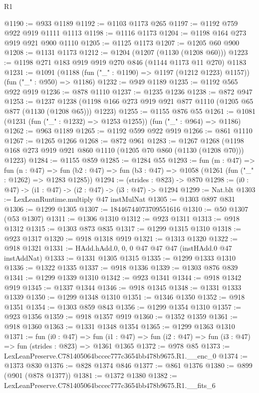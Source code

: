 \begin{lexlean}{R1}
\begin{coremodule}
@1190 := @933 @1189
@1192 := @1103 @1173 @265
@1197 := @1192 @759 @922 @919 @1111 @1113
@1198 := @1116 @1173
@1204 := @1198 @164 @273 @919 @921 @900 @1110
@1205 := @1125 @1173
@1207 := @1205 @60 @900
@1208 := @1131 @1173
@1212 := @1204 (@1207 (@1130 (@1208 @60)))
@1223 := @1198 @271 @183 @919 @919 @270 @846 (@1144 @1173 @11 @270) @1183
@1231 := @1091 (@1188 (fun ("_" : @1190) => @1197 (@1212 @1223) @1157)) (fun ("_" : @950) => @1186)
@1232 := @949 @1189
@1235 := @1192 @565 @922 @919
@1236 := @878 @1110
@1237 := @1235 @1236
@1238 := @872 @947
@1253 := @1237
    @1238
    (@1198 @166 @273 @919 @921 @877 @1110 (@1205 @65 @877 (@1130 (@1208 @65))) @1223)
@1255 := @1155 @876 @55
@1261 := @1081 (@1231 (fun ("_" : @1232) => @1253 @1255)) (fun ("_" : @964) => @1186)
@1262 := @963 @1189
@1265 := @1192 @599 @922 @919
@1266 := @861 @1110
@1267 := @1265 @1266
@1268 := @872 @961
@1283 := @1267
    @1268
    (@1198 @168 @273 @919 @921 @860 @1110 (@1205 @70 @860 (@1130 (@1208 @70))) @1223)
@1284 := @1155 @859
@1285 := @1284 @55
@1293 := fun (m : @47) =>
  fun (n : @47) =>
  fun (b2 : @47) => fun (b3 : @47) => @1058 (@1261 (fun ("_" : @1262) => @1283 @1285))
@1294 := (strides : @823) -> @870
@1298 := (i0 : @47) -> (i1 : @47) -> (i2 : @47) -> (i3 : @47) -> @1294
@1299 := Nat.blt
@1303 := LexLeanRuntime.multiply @47 instMulNat
@1305 := @1303 @897 @831
@1306 := @1299 @1305
@1307 := 18446744073709551616
@1310 := @50 @1307 (@53 @1307)
@1311 := @1306 @1310
@1312 := @923 @1311
@1313 := @918 @1312
@1315 := @1303 @873 @835
@1317 := @1299 @1315 @1310
@1318 := @923 @1317
@1320 := @918 @1318 @919
@1321 := @1313 @1320
@1322 := @918 @1321
@1331 := HAdd.hAdd.{0, 0, 0} @47 @47 @47 (instHAdd.{0} @47 instAddNat)
@1333 := @1331 @1305 @1315
@1335 := @1299 @1333 @1310
@1336 := @1322 @1335
@1337 := @918 @1336
@1339 := @1303 @876 @839
@1341 := @1299 @1339 @1310
@1342 := @923 @1341
@1344 := @918 @1342 @919
@1345 := @1337 @1344
@1346 := @918 @1345
@1348 := @1331 @1333 @1339
@1350 := @1299 @1348 @1310
@1351 := @1346 @1350
@1352 := @918 @1351
@1354 := @1303 @859 @843
@1356 := @1299 @1354 @1310
@1357 := @923 @1356
@1359 := @918 @1357 @919
@1360 := @1352 @1359
@1361 := @918 @1360
@1363 := @1331 @1348 @1354
@1365 := @1299 @1363 @1310
@1371 := fun (i0 : @47) =>
  fun (i1 : @47) => fun (i2 : @47) => fun (i3 : @47) => fun (strides : @823) => @1361 @1365
@1372 := @978 @85
@1373 := LexLeanPreserve.C781405064bccec777c3654bb478b9675.R1.__enc_0
@1374 := @1373 @830
@1376 := @828 @1374 @846
@1377 := @861 @1376
@1380 := @899 (@901 (@878 @1377))
@1381 := @1372 @1380
@1382 := LexLeanPreserve.C781405064bccec777c3654bb478b9675.R1.__fits_6

\end{coremodule}
\end{lexlean}

